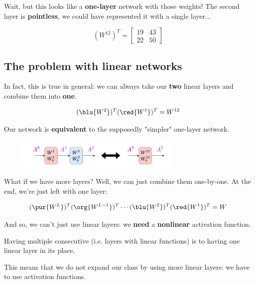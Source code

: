         Wait, but this looks like a \textbf{one-layer} network with those weights! The second layer is \textbf{pointless}, we could have represented it with a single layer...
       
        \begin{equation}
           (W^{12})^T = 
           \begin{bmatrix}
                19 & 43 \\ 22 & 50
            \end{bmatrix}
        \end{equation}
    
    \subsection*{The problem with linear networks}
    
        In fact, this is true in general: we can always take our \textbf{two} linear layers and combine them into \textbf{one}.
        
        \begin{equation}
            (\blu{W^2})^T (\red{W^1})^T
            = W^{12}
        \end{equation}
        
        Our network is \textbf{equivalent} to the supposedly "simpler" one-layer network.
    
        \begin{figure}[H]
            \centering
            \includegraphics[width=80mm,scale=0.4]{images/nn_images/equivalent_networks.png}
        \end{figure}
        
        What if we have more layers? Well, we can just combine them one-by-one. At the end, we're just left with one layer:
        
        \begin{equation}
            (\pur{W^L})^T (\org{ {W^{L-1}} })^T \cdots (\blu{W^2})^T (\red{W^1})^T
            = W
        \end{equation}
        
        And so, we can't just use linear layers: we \textbf{need} a \textbf{nonlinear} activation function.\\
        
        \begin{concept}
            Having multiple consecutive  (i.e. layers with linear  functions) is  to having one linear layer in its place.
            
            This means that we do not expand our  class by using more linear layers: we have to use  activation functions.
        \end{concept}

